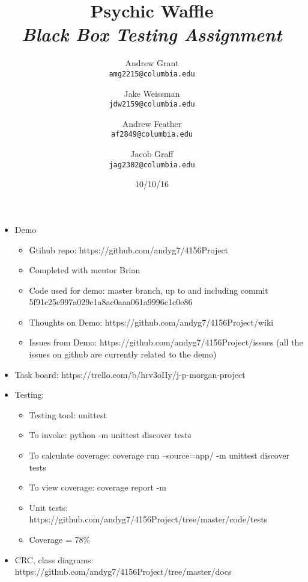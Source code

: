\documentclass{article}
\title{Psychic Waffle \\
	\textit{Black Box Testing Assignment}}
\author{
    Andrew Grant\\
    \texttt{amg2215@columbia.edu}
    \and
    Jake Weissman\\
    \texttt{jdw2159@columbia.edu}
        \and
    Andrew Feather\\
    \texttt{af2849@columbia.edu}
        \and
    Jacob Graff\\
    \texttt{jag2302@columbia.edu}
}
\date{10/10/16}
\begin{document}
\maketitle

\section{}
\begin{itemize}
\item Demo
\begin{itemize}
\item Gtihub repo: https://github.com/andyg7/4156Project
\item Completed with mentor Brian
\item Code used for demo: master branch, up to and including commit 5f91c25e997a029c1a8ac0aaa061a9996c1c0e86
\item Thoughts on Demo: https://github.com/andyg7/4156Project/wiki
\item Issues from Demo: https://github.com/andyg7/4156Project/issues (all the issues on github are currently related to the demo)
\end{itemize}

\item Task board: https://trello.com/b/hrv3oIIy/j-p-morgan-project
\item Testing:
\begin{itemize}
\item Testing tool: unittest
\item To invoke: python -m unittest discover tests
\item To calculate coverage: coverage run --source=app/  -m unittest discover tests
\item To view coverage: coverage report -m
\item Unit tests: https://github.com/andyg7/4156Project/tree/master/code/tests
\item Coverage = 78\%
\end{itemize}
\item CRC, class diagrams: https://github.com/andyg7/4156Project/tree/master/docs
\end{itemize}
\end{document}
